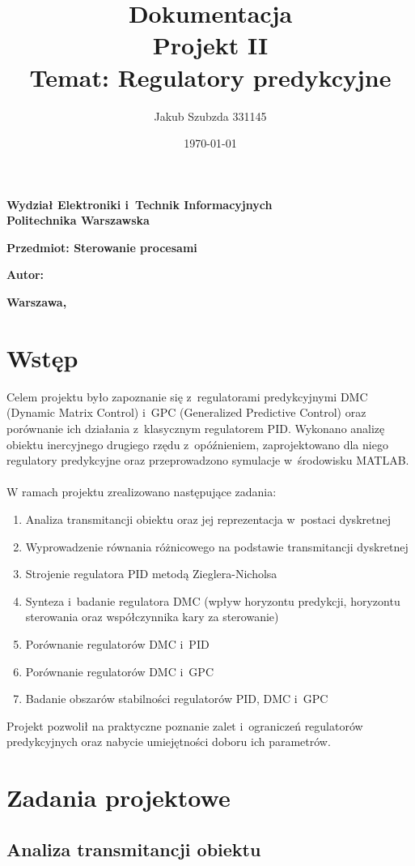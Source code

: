 \documentclass[a4paper,titlepage,11pt,floatssmall]{mwrep}
\title{\bf Dokumentacja \\ Projekt II \\ Temat: Regulatory predykcyjne}
\author{Jakub Szubzda 331145}
\date{\today}
\makeatletter
\renewcommand{\maketitle}{\begin{titlepage}
\begin{center}{\LARGE {\bf
Wydział Elektroniki i~Technik Informacyjnych}}\\
\vspace{0.4cm}
{\LARGE {\bf Politechnika Warszawska}}\\
\vspace{0.3cm}
\end{center}
\vspace{5cm}
\begin{center}
{\bf \LARGE Przedmiot: Sterowanie procesami \vskip 0.1cm}
\end{center}
\vspace{1cm}
\begin{center}
{\bf \LARGE \@title \vskip 0.1cm}
\end{center}
\vspace{2cm}
\begin{center}
{\bf \Large Autor: \@author \par}
\end{center}
\vspace*{\stretch{6}}
\begin{center}
\bf{\large{Warszawa, \@date\vskip 0.1cm}}
\end{center}
\end{titlepage}
}
\makeatother
\begin{document}
\frenchspacing
\pagestyle{uheadings}

\maketitle

\tableofcontents

\chapter{Wstęp}

Celem projektu było zapoznanie się z~regulatorami predykcyjnymi DMC (Dynamic Matrix Control) i~GPC (Generalized Predictive Control) oraz porównanie ich działania z~klasycznym regulatorem PID. Wykonano analizę obiektu inercyjnego drugiego rzędu z~opóźnieniem, zaprojektowano dla niego regulatory predykcyjne oraz przeprowadzono symulacje w~środowisku MATLAB.
\\\\
W ramach projektu zrealizowano następujące zadania:
\begin{enumerate}
    \item Analiza transmitancji obiektu oraz jej reprezentacja w~postaci dyskretnej
    \item Wyprowadzenie równania różnicowego na podstawie transmitancji dyskretnej
    \item Strojenie regulatora PID metodą Zieglera-Nicholsa
    \item Synteza i~badanie regulatora DMC (wpływ horyzontu predykcji, horyzontu sterowania oraz współczynnika kary za sterowanie)
    \item Porównanie regulatorów DMC i~PID
    \item Porównanie regulatorów DMC i~GPC
    \item Badanie obszarów stabilności regulatorów PID, DMC i~GPC
\end{enumerate}

Projekt pozwolił na praktyczne poznanie zalet i~ograniczeń regulatorów predykcyjnych oraz nabycie umiejętności doboru ich parametrów.

\chapter{Zadania projektowe}

\section{Analiza transmitancji obiektu}
\end{document}
